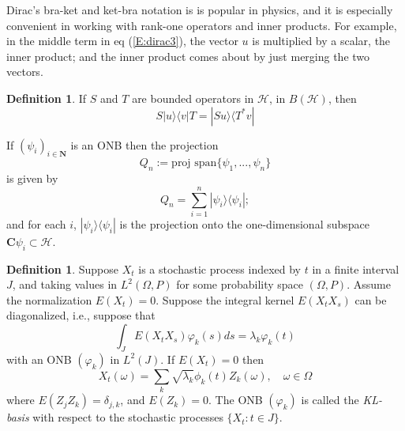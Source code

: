 \documentclass{amsart}
\theoremstyle{definition}
\newtheorem{definition}[theorem]{Definition}
\theoremstyle{remark}
\numberwithin{equation}{section}
\begin{document}
Dirac's bra-ket and ket-bra notation is is popular in physics, and it is 
especially convenient in working with rank-one operators and inner products. 
For example, in the middle term in eq (\ref{E:dirac3}), the vector $u$ is 
multiplied by a scalar, the inner product; and the inner product comes about 
by just merging the two vectors.

\begin{definition}
\label{D:6.3}
If $S$ and $T$ are bounded operators in $\mathcal{H}$, in $B(\mathcal{H})$, 
then 
\begin{equation}
\label{E:fact3}
S|u \rangle \langle v|T = |Su \rangle \langle T^{*}v|
\end{equation}

If $(\psi_{i})_{i \in \mathbf{N}}$ is an ONB then the projection 
\[
  Q_{n}:= \text{proj span}\{\psi_{1}, ... , \psi_{n}\}
\]
is given by
\begin{equation}
\label{E:fact4}
  Q_{n} = \sum_{i=1}^{n}|\psi_{i} \rangle \langle \psi_{i}|; 
\end{equation}
and for each $i$, $|\psi_{i} \rangle \langle \psi_{i}|$ is the projection onto 
the one-dimensional subspace $\mathbf{C} \psi_{i} \subset \mathcal{H}$.
\end{definition}

\begin{definition}
\label{D:6.4}
Suppose $X_{t}$ is a stochastic process indexed by $t$ in a finite interval 
$J$, and taking values in $L^{2}(\Omega, P)$ for some probability space 
$(\Omega, P)$. Assume the normalization $E(X_{t})=0$. Suppose the integral 
kernel $E(X_{t} X_{s})$ can be 
diagonalized, i.e., suppose that 
\[
  \int_{J}{E(X_{t} X_{s})\varphi_{k}(s)}ds=\lambda_{k}\varphi_{k}(t)
\]
with an ONB $(\varphi_{k})$ in $L^{2}(J)$.  If $E(X_{t})=0$ then
\[
  X_{t}(\omega)=\sum_{k}\sqrt{\lambda_{k}}\phi_{k}(t)Z_{k}(\omega), 
  \quad \omega \in \Omega
\]
where $E(Z_{j} Z_{k})=\delta_{j,k}$, and $E(Z_{k})=0$.
The ONB $(\varphi_{k})$ is called the \textit{KL-basis} with respect to the 
stochastic processes $\{X_{t}: t \in J \}$.
\end{definition}
\end{document}
